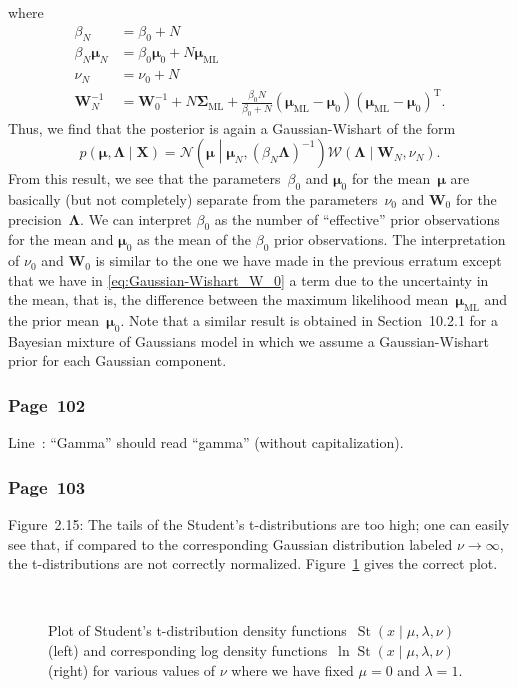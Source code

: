 \documentclass[12pt,a4paper]{article}
\newcommand{\erratum}[1]{\subsubsection*{#1}}
\begin{document}
where
\begin{align}
\beta_N &= \beta_0 + N \\
\beta_N\bm{\mu}_N &= \beta_0\bm{\mu}_0 + N\bm{\mu}_{\text{ML}} \\
\nu_N &= \nu_0 + N \\
\mathbf{W}_{N}^{-1} &= \mathbf{W}_{0}^{-1} + N \bm{\Sigma}_{\text{ML}} +
\frac{\beta_0 N}{\beta_0 + N}
\left(\bm{\mu}_{\text{ML}} - \bm{\mu}_0\right)
\left(\bm{\mu}_{\text{ML}} - \bm{\mu}_0\right)^{\operatorname{T}} .
\label{eq:Gaussian-Wishart_W_0}
\end{align}
Thus, we find that the posterior is again a Gaussian-Wishart of the form
\begin{equation}
p\left(\bm{\mu}, \bm{\Lambda}\middle|\mathbf{X}\right) =
\mathcal{N}\left(\bm{\mu}\middle|\bm{\mu}_N, \left(\beta_N\bm{\Lambda}\right)^{-1}\right)
\mathcal{W}\left(\bm{\Lambda}\middle|\mathbf{W}_N, \nu_N\right) .
\end{equation}
From this result, we see that
the parameters~$\beta_0$ and $\bm{\mu}_0$ for the mean~$\bm{\mu}$ are basically
(but not completely) separate from
the parameters~$\nu_0$ and $\mathbf{W}_0$ for the precision~$\bm{\Lambda}$.
We can interpret $\beta_0$ as the number of ``effective'' prior observations for the mean and
$\bm{\mu}_0$ as the mean of the $\beta_0$ prior observations.
The interpretation of $\nu_0$ and $\mathbf{W}_0$ is similar to
the one we have made in the previous erratum except that
we have in \eqref{eq:Gaussian-Wishart_W_0} a term due to the uncertainty in the mean,
that is, the difference between the maximum likelihood mean~$\bm{\mu}_{\text{ML}}$ and
the prior mean~$\bm{\mu}_0$.
Note that a similar result is obtained in Section~10.2.1 for a Bayesian mixture of Gaussians model
in which we assume a Gaussian-Wishart prior for each Gaussian component.

\erratum{Page~102}
Line~:
``Gamma'' should read ``gamma'' (without capitalization).

\erratum{Page~103}
Figure~2.15: The tails of the Student's t-distributions are too high;
one can easily see that, if compared to the corresponding Gaussian distribution
labeled $\nu\to\infty$,
the t-distributions are not correctly normalized.
Figure~\ref{fig:Student_t_densities} gives the correct plot.

\begin{figure}
\centering
~%

\caption{Plot of Student's t-distribution density
functions~$\operatorname{St}\left(x\middle|\mu, \lambda, \nu\right)$ (left) and
corresponding log density
functions~$\ln\operatorname{St}\left(x\middle|\mu, \lambda, \nu\right)$ (right)
for various values of $\nu$ where we have fixed $\mu = 0$ and $\lambda = 1$. }
\label{fig:Student_t_densities}
\end{figure}
\end{document}
